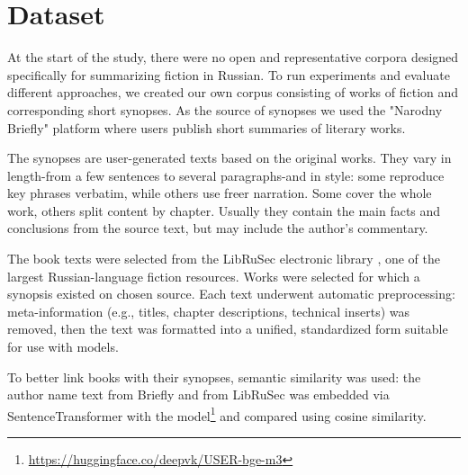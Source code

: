 \documentclass{superfri}
\begin{document}
\section{Dataset}
At the start of the study, there were no open and representative corpora designed specifically for summarizing fiction in Russian.
To run experiments and evaluate different approaches, we created our own corpus consisting of works of fiction and corresponding short synopses.
As the source of synopses we used the "Narodny Briefly" platform \cite{Briefly} where users publish short summaries of literary works.

The synopses are user-generated texts based on the original works. They vary in length-from a few sentences to several paragraphs-and in style: some reproduce key phrases verbatim, 
while others use freer narration. Some cover the whole work, others split content by chapter.
Usually they contain the main facts and conclusions from the source text, but may include the author’s commentary.

The book texts were selected from the LibRuSec electronic library \cite{librusec}, one of the largest Russian-language fiction resources.
Works were selected for which a synopsis existed on chosen source\cite{Briefly}. Each text underwent automatic preprocessing: meta-information (e.g., titles, chapter descriptions, technical inserts) was removed,
then the text was formatted into a unified, standardized form suitable for use with models.

To better link books with their synopses, semantic similarity was used: the author name text from Briefly \cite{Briefly} and from LibRuSec \cite{librusec} was embedded via SentenceTransformer
with the model\footnote{\label{encoder}\url{https://huggingface.co/deepvk/USER-bge-m3}}
and compared using cosine similarity.

\end{document}
